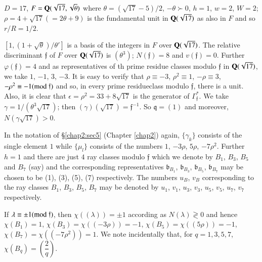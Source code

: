 \begin{exam}\label{exam8}
$D=17$, $F=\mathbf{Q}(\sqrt{17},\sqrt{\theta})$ where
  $\theta=(\sqrt{17}-5)/2$, $-\theta \succ 0$, $h=1$, $w=2$, $W=2$;
  $\rho=4+\sqrt{17}(=2\theta+9)$ is the fundamental unit in
  $\mathbf{Q}(\sqrt{17})$ as also in $F$ and so $r/R=1/2$.
\end{exam}

$[1,(1+\sqrt{\theta})/\theta']$ is a basis of the integers in $F$ over
$\mathbf{Q}(\sqrt{17})$. The relative discriminant $\mathfrak{f}$ of $F$ over
$\mathbf{Q}(\sqrt{17})$ is $(\theta^{3})$; $N(\mathfrak{f})=8$ and
$v(\mathfrak{f})=0$. Further $\varphi(\mathfrak{f})=4$ and as
representatives of th prime residue classes modulo $\mathfrak{f}$ in
$\mathbf{Q}(\sqrt{17})$, we take $1$, $-1$, $3$, $-3$. It is easy to verify
that $\rho\equiv -3$, $\rho^{2}\equiv 1$, $-\rho\equiv 3$,
$-\rho^{2}\equiv -1(\rm{mod} \; \mathfrak{f})$ and so, in every prime
residue\pageoriginale class modulo $\mathfrak{f}$, there is a
unit. Also, it is clear that $\epsilon=\rho^{2}=33+8\sqrt{17}$ is the
generator of $\Gamma^{\ast}_{\mathfrak{f}}$. We take
$\gamma=1/(\theta^{3}\sqrt{17})$; then
$(\gamma)(\sqrt{17})=\mathfrak{f}^{-1}$. So $\mathfrak{q}=(1)$ and
moreover, $N(\gamma\sqrt{17})>0$.

In the notation of \S \ref{chap2:sec5} (Chapter \ref{chap2}) again,
$\{\gamma_{k}\}$ consists 
of the single element $1$ while $\{\mu_{l}\}$ consists of the numbers
$1$, $-3\rho$, $5\rho$, $-7\rho^{2}$. Further $h=1$ and there are just
$4$ ray classes modulo $\mathfrak{f}$ which we denote by $B_{1}$,
$B_{3}$, $B_{5}$ and $B_{7}$ (say) and the corresponding
representatives $\mathfrak{b}_{B_{1}}$, $\mathfrak{b}_{B_{3}}$,
$\mathfrak{b}_{B_{5}}$, $\mathfrak{b}_{B_{7}}$ may be chosen to be
(1), (3), (5), (7) respectively. The numbers $u_{B}$, $v_{B}$
corresponding to the ray classes $B_{1}$, $B_{3}$, $B_{5}$, $B_{7}$
may be denoted by $u_{1}$, $v_{1}$, $u_{3}$, $v_{3}$, $u_{5}$,
$v_{5}$, $u_{7}$, $v_{7}$ respectively.

If $\lambda\equiv\pm 1(\rm{mod} \;\mathfrak{f})$, then $\chi((\lambda))=\pm
1$ according as $N(\lambda)\gtrless 0$ and hence $\chi(B_{1})=1$,
$\chi(B_{3})=\chi((-3\rho))=-1$, $\chi(B_{5})=\chi((5\rho))=-1$,
$\chi(B_{7})=\chi((-7\rho^{2}))=1$. We note incidentally that, for
$q=1,3,5,7$, $\chi(B_{q})=\left(\dfrac{2}{q}\right)$.

